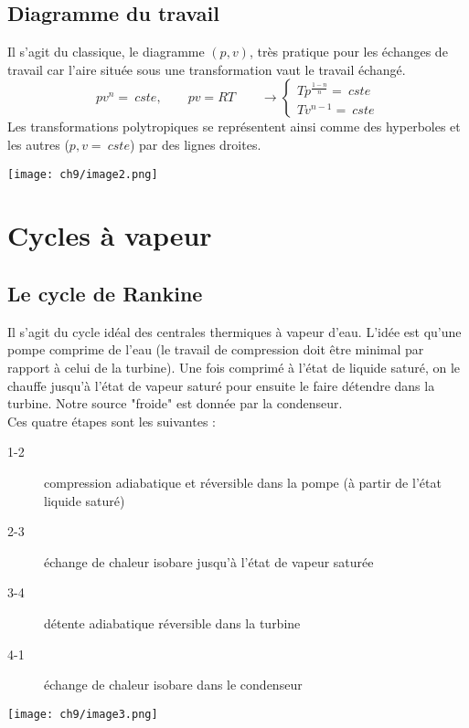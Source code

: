 	\subsection{Diagramme du travail}
	Il s'agit du classique, le diagramme $(p,v)$, très pratique pour les échanges de 
	travail car l'aire située sous une transformation vaut le travail échangé. 
	\begin{equation}
	pv^n=\ cste,\qquad pv = RT\qquad \rightarrow \left\{\begin{array}{ll}
	Tp^{\frac{1-n}{n}}=\ cste\\
	Tv^{n-1}=\ cste	
	\end{array}\right.
	\end{equation}		
	Les transformations polytropiques se représentent ainsi comme des hyperboles 
	et les autres ($p,v=\ cste$) par des lignes droites.
	\begin{center}
	\texttt{[image: ch9/image2.png]}
	\end{center}	
	
	
	
\section{Cycles à vapeur}
	\subsection{Le cycle de Rankine}		
	Il s'agit du cycle idéal des centrales thermiques à vapeur d'eau. L'idée est 
	qu'une pompe comprime de l'eau (le travail de compression doit être minimal 
	par rapport à celui de la turbine). Une fois comprimé à l'état de liquide 
	saturé, on le chauffe jusqu'à l'état de vapeur saturé pour ensuite le faire 
	détendre dans la turbine. Notre source "froide" est donnée par la condenseur.\\
	Ces quatre étapes sont les suivantes :
	\begin{description}
	\item[1-2] compression adiabatique et réversible dans la pompe (à partir de 
	l'état liquide saturé)
	\item[2-3] échange de chaleur isobare jusqu'à l'état de vapeur saturée
	\item[3-4] détente adiabatique réversible dans la turbine
	\item[4-1] échange de chaleur isobare dans le condenseur
	\end{description}
	\begin{center}
	\texttt{[image: ch9/image3.png]}
	\end{center}

